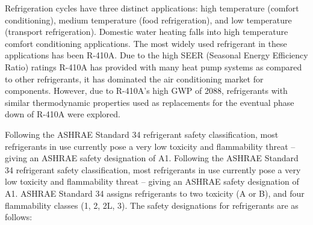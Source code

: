 \medskip
Refrigeration cycles have three distinct applications: high temperature (comfort conditioning), medium temperature (food refrigeration), and low temperature (transport refrigeration). Domestic water heating falls into high temperature comfort conditioning applications. The most widely used refrigerant in these applications has been R-410A. Due to the high SEER (Seasonal Energy Efficiency Ratio) ratings R-410A has provided with many heat pump systems as compared to other refrigerants, it has dominated the air conditioning market for components. However, due to R-410A’s high GWP of 2088, refrigerants with similar thermodynamic properties used as replacements for the eventual phase down of R-410A were explored.

\newpage
Following the ASHRAE Standard 34 refrigerant safety classification, most refrigerants in use currently pose a very low toxicity and flammability threat – giving an ASHRAE safety designation of A1. Following the ASHRAE Standard 34 \cite{ashrae_safety} refrigerant safety classification, most refrigerants in use currently pose a very low toxicity and flammability threat – giving an ASHRAE safety designation of A1. ASHRAE Standard 34 assigns refrigerants to two toxicity (A or B), and four flammability classes (1, 2, 2L, 3). The safety designations for refrigerants are as follows:

